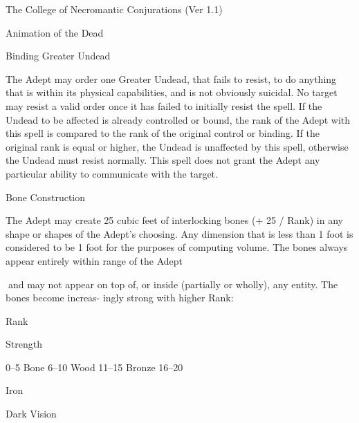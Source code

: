 \begin{Chapter}{The College of Necromantic Conjurations (Ver 1.1)}
\begin{spell}[S-2]{Animation of the Dead }
\begin{effects}
\end{effects}
\end{spell}

\begin{spell}[S-3]{Binding Greater Undead }

\begin{effects}
The Adept may order one Greater Undead, 
that fails to resist, to do anything that is within its 
physical capabilities, and is not obviously suicidal. 
No target may resist a valid order once it has failed 
to  initially  resist  the  spell.  If  the  Undead  to  be 
affected is already controlled or bound, the rank of 
the Adept with this spell is compared to the rank of 
the original control or binding. If the original rank 
is equal or higher, the Undead is unaffected by this 
spell,  otherwise  the  Undead  must  resist  normally. 
This  spell  does  not  grant  the  Adept  any  particular 
ability to communicate with the target. 

\end{effects}
\end{spell}

\begin{spell}[S-4]{Bone Construction }

\begin{effects}
 The  Adept  may  create  25  cubic  feet  of 
interlocking  bones  (+  25  /  Rank)  in  any  shape  or 
shapes  of  the  Adept’s  choosing.  Any  dimension 
that is less than 1 foot is considered to be 1 foot for 
the  purposes  of  computing  volume.  The  bones 
always  appear  entirely  within  range  of  the  Adept 

and  may  not  appear  on  top  of,  or  inside  (partially 
or  wholly), any entity. The bones become increas-
ingly strong with higher Rank: 

Rank 

Strength 

0–5 
Bone 
6–10  Wood 
11–15  Bronze 
16–20 

Iron 

\end{effects}
\end{spell}

\begin{spell}[S-5]{Dark Vision }


\end{spell}
\end{Chapter}
